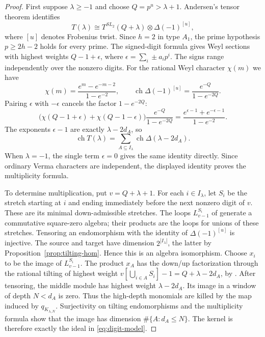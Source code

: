 \documentclass[11pt,reqno]{amsart}
\theoremstyle{definition}
\theoremstyle{remark}
\numberwithin{equation}{section}
\begin{document}
\begin{proof}
First suppose $\lambda\geq-1$ and choose $Q=p^u>\lambda+1$.
Andersen's tensor theorem \cite[Theorem~7.7(2)]{Andersen} identifies
\begin{equation}\label{eq:andersen-rank-one}
 T(\lambda)\cong
 T^{SL_2}(Q+\lambda)\otimes\Delta(-1)^{[u]},
\end{equation}
where $[u]$ denotes Frobenius twist. Since $h=2$ in type $A_1$,
the prime hypothesis $p\geq2h-2$ holds for every prime.
The signed-digit formula \cite[Proposition~5.4]{TW} gives Weyl
sections with highest weights
$Q-1+\epsilon$, where $\epsilon=\sum_i\pm a_ip^i$. The signs range
independently over the nonzero digits. For the rational Weyl
character $\chi(m)$ we have
\[
 \chi(m)=\frac{e^m-e^{-m-2}}{1-e^{-2}},\qquad
 \operatorname{ch}\Delta(-1)^{[u]}=
              \frac{e^{-Q}}{1-e^{-2Q}}.
\]
Pairing $\epsilon$ with $-\epsilon$ cancels the factor
$1-e^{-2Q}$:
\[
 \bigl(\chi(Q-1+\epsilon)+\chi(Q-1-\epsilon)\bigr)
       \frac{e^{-Q}}{1-e^{-2Q}}
 =\frac{e^{\epsilon-1}+e^{-\epsilon-1}}{1-e^{-2}}.
\]
The exponents $\epsilon-1$ are exactly $\lambda-2d_A$, so
\[
 \operatorname{ch}T(\lambda)
 =\sum_{A\subseteq I_\lambda}
       \operatorname{ch}\Delta(\lambda-2d_A).
\]
When $\lambda=-1$, the single term $\epsilon=0$ gives the same
identity directly. Since ordinary Verma characters are independent,
the displayed identity proves the multiplicity formula.

To determine multiplication, put $v=Q+\lambda+1$. For each
$i\in I_\lambda$, let $S_i$ be the stretch starting at $i$ and
ending immediately before the next nonzero digit of $v$.
These are its minimal down-admissible stretches. The loops
$L^{S_i}_{v-1}$ of \cite[Lemma~3.25]{TW} generate a commutative
square-zero algebra; their products are the loops for unions of
these stretches. Tensoring an
endomorphism with the identity of $\Delta(-1)^{[u]}$ is injective.
The source and target have dimension $2^{|I_\lambda|}$, the latter
by Proposition~\ref{prop:tilting-hom}. Hence this is an algebra
isomorphism. Choose $x_i$ to be the image of $L^{S_i}_{v-1}$.
The product $x_A$ has the down/up factorization through the rational
tilting of highest weight $v[\bigcup_{i\in A}S_i]-1
=Q+\lambda-2d_A$, by \cite[Theorem~3.2 and Lemma~3.25]{TW}.
After tensoring,
the middle module has highest weight $\lambda-2d_A$.
Its image in a window of depth $N<d_A$ is zero. Thus the high-depth
monomials are killed by the map induced by $q_{K_{\lambda,N}}$.
Surjectivity on
tilting endomorphisms and the multiplicity formula show that the
image has dimension $\#\{A:d_A\leq N\}$. The kernel is therefore
exactly the ideal in \eqref{eq:digit-model}.


\end{proof}
\end{document}
